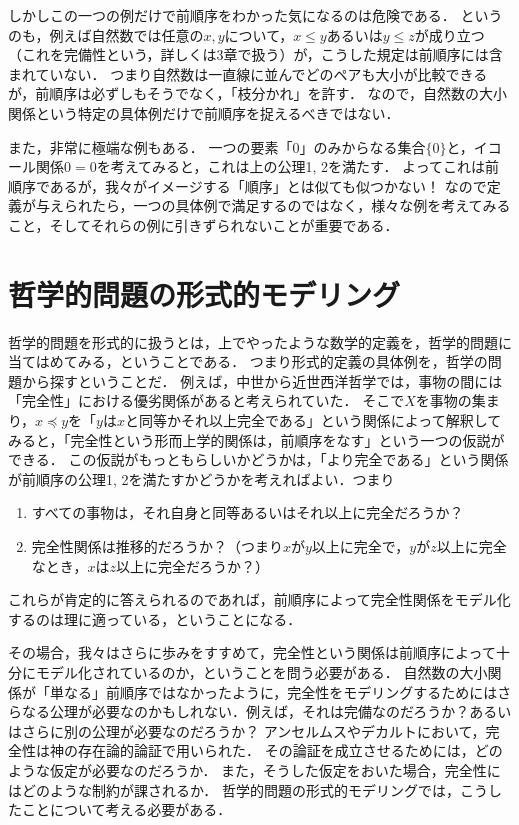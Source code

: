 \documentclass[11pt,a4paper]{jsarticle}
\begin{document}
しかしこの一つの例だけで前順序をわかった気になるのは危険である．
というのも，例えば自然数では任意の$x,y$について，$x \leq y$あるいは$y \leq z$が成り立つ（これを完備性という，詳しくは3章で扱う）が，こうした規定は前順序には含まれていない．
つまり自然数は一直線に並んでどのペアも大小が比較できるが，前順序は必ずしもそうでなく，「枝分かれ」を許す．
なので，自然数の大小関係という特定の具体例だけで前順序を捉えるべきではない．

また，非常に極端な例もある．
一つの要素「0」のみからなる集合$\{ 0 \}$と，イコール関係$0 = 0$を考えてみると，これは上の公理1, 2を満たす．
よってこれは前順序であるが，我々がイメージする「順序」とは似ても似つかない！
なので定義が与えられたら，一つの具体例で満足するのではなく，様々な例を考えてみること，そしてそれらの例に引きずられないことが重要である．




\section{哲学的問題の形式的モデリング}

哲学的問題を形式的に扱うとは，上でやったような数学的定義を，哲学的問題に当てはめてみる，ということである．
つまり形式的定義の具体例を，哲学の問題から探すということだ．
例えば，中世から近世西洋哲学では，事物の間には「完全性」における優劣関係があると考えられていた．
そこで$X$を事物の集まり，$x \preceq y$を「$y$は$x$と同等かそれ以上完全である」という関係によって解釈してみると，「完全性という形而上学的関係は，前順序をなす」という一つの仮説ができる．
この仮説がもっともらしいかどうかは，「より完全である」という関係が前順序の公理1, 2を満たすかどうかを考えればよい．つまり
\begin{enumerate}
 \item すべての事物は，それ自身と同等あるいはそれ以上に完全だろうか？
 \item 完全性関係は推移的だろうか？（つまり$x$が$y$以上に完全で，$y$が$z$以上に完全なとき，$x$は$z$以上に完全だろうか？）
\end{enumerate}
これらが肯定的に答えられるのであれば，前順序によって完全性関係をモデル化するのは理に適っている，ということになる．

その場合，我々はさらに歩みをすすめて，完全性という関係は前順序によって十分にモデル化されているのか，ということを問う必要がある．
自然数の大小関係が「単なる」前順序ではなかったように，完全性をモデリングするためにはさらなる公理が必要なのかもしれない．例えば，それは完備なのだろうか？あるいはさらに別の公理が必要なのだろうか？
アンセルムスやデカルトにおいて，完全性は神の存在論的論証で用いられた．
その論証を成立させるためには，どのような仮定が必要なのだろうか．
また，そうした仮定をおいた場合，完全性にはどのような制約が課されるか．
哲学的問題の形式的モデリングでは，こうしたことについて考える必要がある．
\end{document}
